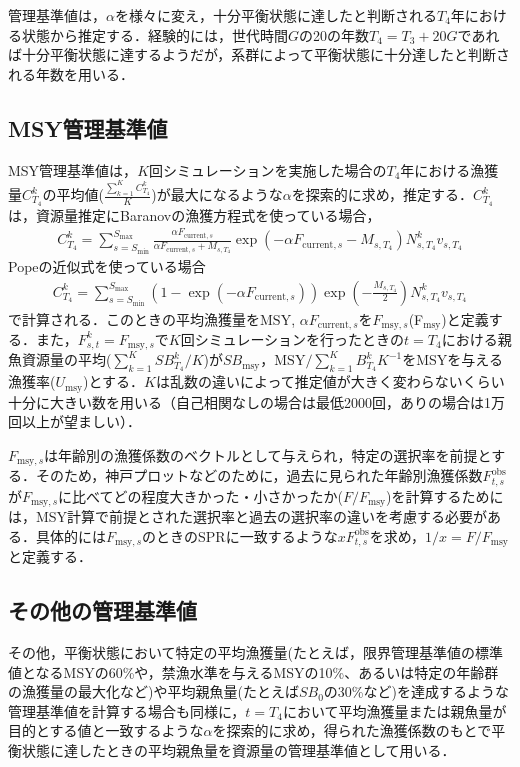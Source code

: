 \documentclass[11pt]{jsarticle}
\begin{document}
管理基準値は，$\alpha$を様々に変え，十分平衡状態に達したと判断される$T_4$年における状態から推定する．経験的には，世代時間$G$の20の年数$T_4=T_3+20G$であれば十分平衡状態に達するようだが，系群によって平衡状態に十分達したと判断される年数を用いる．

\subsection{MSY管理基準値}
MSY管理基準値は，$K$回シミュレーションを実施した場合の$T_4$年における漁獲量$C_{T_4}^k$の平均値($\frac{\sum_{k=1}^K C_{T_4}^k}{K}$)が最大になるような$\alpha$を探索的に求め，推定する．$C_{T_4}^k$は，資源量推定にBaranovの漁獲方程式を使っている場合，
\begin{eqnarray}
  C_{T_4}^k=\sum_{s=S_{\mathrm{min}}}^{S_{\mathrm{max}}} \frac{\alpha F_{\mathrm{current},s}}{\alpha F_{\mathrm{current},s}+M_{s,T_4}}
  \exp(-\alpha F_{\mathrm{current},s}-M_{s,T_4}) N_{s,T_4}^k v_{s,T_4}
\end{eqnarray}
Popeの近似式を使っている場合
\begin{eqnarray}
  C_{T_4}^k=\sum_{s=S_{\mathrm{min}}}^{S_{\mathrm{max}}} (1-\exp(-\alpha F_{\mathrm{current},s})) \exp(-\frac{M_{s,T_4}}{2})N_{s,T_4}^k v_{s,T_4} 
\end{eqnarray}
で計算される．このときの平均漁獲量を$\mathrm{MSY}$, $\alpha F_{\mathrm{current},s}$を$F_{\mathrm{msy},s}$(F$_{\mathrm{msy}}$)と定義する．また，$F_{s,t}^k=F_{\mathrm{msy},s}$で$K$回シミュレーションを行ったときの$t=T_4$における親魚資源量の平均($\sum_{k=1}^K S\!B_{T_4}^k /K$)が$S\!B_{\mathrm{msy}}$，$\mathrm{MSY}/ \sum_{k=1}^K B_{T_4}^k K^{-1}$をMSYを与える漁獲率($U_{\mathrm{msy}}$)とする．$K$は乱数の違いによって推定値が大きく変わらないくらい十分に大きい数を用いる（自己相関なしの場合は最低2000回，ありの場合は1万回以上が望ましい）．

$F_{\mathrm{msy},s}$は年齢別の漁獲係数のベクトルとして与えられ，特定の選択率を前提とする．そのため，神戸プロットなどのために，過去に見られた年齢別漁獲係数$F_{t,s}^{\mathrm{obs}}$が$F_{\mathrm{msy},s}$に比べてどの程度大きかった・小さかったか($F/F_{\mathrm{msy}}$)を計算するためには，MSY計算で前提とされた選択率と過去の選択率の違いを考慮する必要がある．具体的には$F_{\mathrm{msy},s}$のときのSPRに一致するような$x F_{t,s}^{\mathrm{obs}}$を求め，$1/x=F/F_{\mathrm{msy}}$と定義する．

\subsection{その他の管理基準値}
その他，平衡状態において特定の平均漁獲量(たとえば，限界管理基準値の標準値となるMSYの60\%や，禁漁水準を与えるMSYの10\%、あるいは特定の年齢群の漁獲量の最大化など)や平均親魚量(たとえば$S\!B_0$の30\%など)を達成するような管理基準値を計算する場合も同様に，$t=T_4$において平均漁獲量または親魚量が目的とする値と一致するような$\alpha$を探索的に求め，得られた漁獲係数のもとで平衡状態に達したときの平均親魚量を資源量の管理基準値として用いる．
\end{document}
